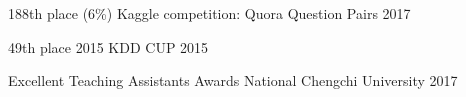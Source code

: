 



\begin{cvhonors}

	\cvhonor
	{188th place (6\%)} %
	{Kaggle competition: Quora Question Pairs} %
	{} %
	{2017} %

	\cvhonor
	{49th place} %
	{2015 KDD CUP} %
	{} %
	{2015} %

\end{cvhonors}




\begin{cvhonors}

	\cvhonor
	{Excellent Teaching Assistants Awards} %
	{National Chengchi University} %
	{} %
	{2017} %


\end{cvhonors}
